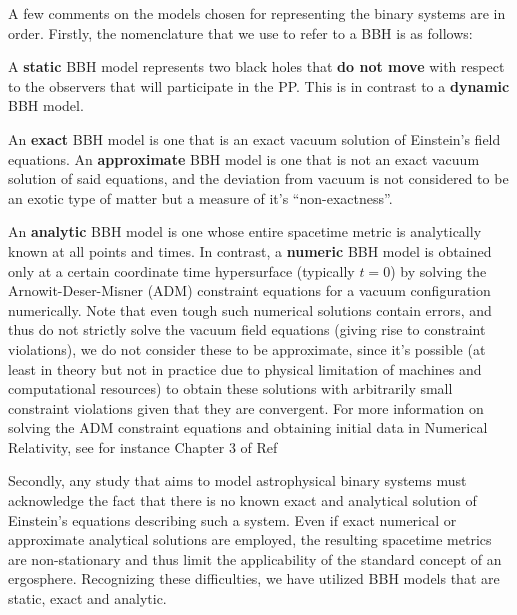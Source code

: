 A few comments on the models chosen for representing the binary systems are in order. Firstly, the nomenclature that we use to refer to a BBH is as follows:

\begin{definition}
    A \textbf{static} BBH model represents two black holes that \textbf{do not move} with respect to the observers that will participate in the PP. This is in contrast to a \textbf{dynamic} BBH model.
\end{definition}

\begin{definition}
    An \textbf{exact} BBH model is one that is an exact vacuum solution of Einstein's field equations. An \textbf{approximate} BBH model is one that is not an exact vacuum solution of said equations, and the deviation from vacuum is not considered to be an exotic type of matter but a measure of it's ``non-exactness''.
\end{definition}

\begin{definition}
    An \textbf{analytic} BBH model is one whose entire spacetime metric is analytically known at all points and times. In contrast, a \textbf{numeric} BBH model is obtained only at a certain coordinate time hypersurface (typically $t=0$) by solving the Arnowit-Deser-Misner (ADM) constraint equations for a vacuum configuration numerically. Note that even tough such numerical solutions contain errors, and thus do not strictly solve the vacuum field equations (giving rise to constraint violations), we do not consider these to be approximate, since it's possible (at least in theory but not in practice due to physical limitation of machines and computational resources) to obtain these solutions with arbitrarily small constraint violations given that they are convergent. For more information on solving the ADM constraint equations and obtaining initial data in Numerical Relativity, see for instance Chapter 3 of Ref~\cite{Alcubierre2012-xp}
\end{definition}

Secondly, any study that aims to model astrophysical binary systems must acknowledge the fact that there is no known exact and analytical solution of Einstein's equations describing such a system. Even if exact numerical or approximate analytical solutions are employed, the resulting spacetime metrics are non-stationary and thus limit the applicability of the standard concept of an ergosphere. Recognizing these difficulties, we have utilized BBH models that are static, exact and analytic.


